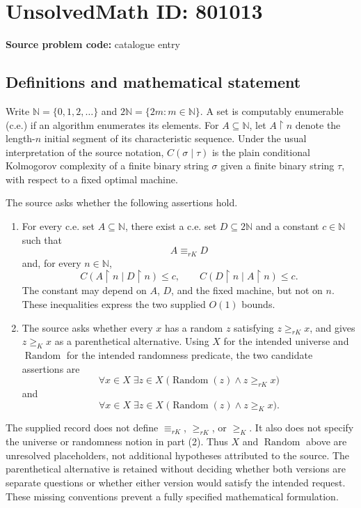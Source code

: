 \documentclass[11pt]{article}
\newcommand{\N}{\mathbb{N}}
\begin{document}
\section*{UnsolvedMath ID: 801013}
\textbf{Source problem code:} catalogue entry
\subsection{Definitions and mathematical statement}
Write \(\N=\{0,1,2,\ldots\}\) and \(2\N=\{2m:m\in\N\}\). A set is computably enumerable (c.e.) if an algorithm enumerates its elements. For \(A\subseteq\N\), let \(A\upharpoonright n\) denote the length-\(n\) initial segment of its characteristic sequence. Under the usual interpretation of the source notation, \(C(\sigma\mid\tau)\) is the plain conditional Kolmogorov complexity of a finite binary string \(\sigma\) given a finite binary string \(\tau\), with respect to a fixed optimal machine.

The source asks whether the following assertions hold.

\begin{enumerate}
\item For every c.e. set \(A\subseteq\N\), there exist a c.e. set \(D\subseteq2\N\) and a constant \(c\in\N\) such that
\[
 A\equiv_{rK}D
\]
and, for every \(n\in\N\),
\[
 C(A\upharpoonright n\mid D\upharpoonright n)\leq c,
 \qquad
 C(D\upharpoonright n\mid A\upharpoonright n)\leq c.
\]
The constant may depend on \(A\), \(D\), and the fixed machine, but not on \(n\). These inequalities express the two supplied \(O(1)\) bounds.
\item The source asks whether every \(x\) has a random \(z\) satisfying \(z\geq_{rK}x\), and gives \(z\geq_Kx\) as a parenthetical alternative. Using \(X\) for the intended universe and \(\operatorname{Random}\) for the intended randomness predicate, the two candidate assertions are
\[
 \forall x\in X\;\exists z\in X\;
 \bigl(\operatorname{Random}(z)\land z\geq_{rK}x\bigr)
\]
and
\[
 \forall x\in X\;\exists z\in X\;
 \bigl(\operatorname{Random}(z)\land z\geq_Kx\bigr).
\]
\end{enumerate}

The supplied record does not define \(\equiv_{rK}\), \(\geq_{rK}\), or \(\geq_K\). It also does not specify the universe or randomness notion in part (2). Thus \(X\) and \(\operatorname{Random}\) above are unresolved placeholders, not additional hypotheses attributed to the source. The parenthetical alternative is retained without deciding whether both versions are separate questions or whether either version would satisfy the intended request. These missing conventions prevent a fully specified mathematical formulation.
\end{document}

